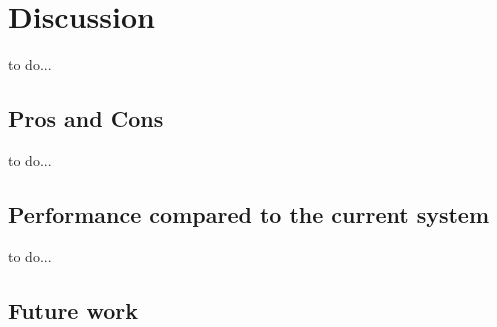\section{Discussion}
\label{S:6}

\begin{answer}
    to do... \\
\end{answer}

\subsection{Pros and Cons}

\begin{answer}
    to do... \\
\end{answer}

\subsection{Performance compared to the current system}

\begin{answer}
    to do... \\
\end{answer}

\subsection{Future work}